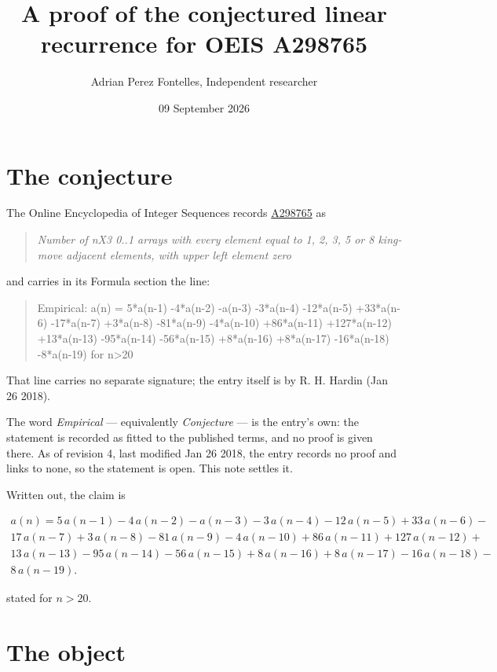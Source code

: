 \documentclass[11pt]{article}
\title{A proof of the conjectured linear recurrence for OEIS A298765}
\author{Adrian Perez Fontelles, Independent researcher}
\date{09 September 2026}
\theoremstyle{definition}
\begin{document}
\maketitle
\section{The conjecture}

The Online Encyclopedia of Integer Sequences records \href{https://oeis.org/A298765}{A298765} as

\begin{quote}\itshape Number of nX3 0..1 arrays with every element equal to 1, 2, 3, 5 or 8 king-move adjacent elements, with upper left element zero\end{quote}

and carries in its Formula section the line:

\begin{quote}\ttfamily Empirical: a(n) = 5*a(n-1) -4*a(n-2) -a(n-3) -3*a(n-4) -12*a(n-5) +33*a(n-6) -17*a(n-7) +3*a(n-8) -81*a(n-9) -4*a(n-10) +86*a(n-11) +127*a(n-12) +13*a(n-13) -95*a(n-14) -56*a(n-15) +8*a(n-16) +8*a(n-17) -16*a(n-18) -8*a(n-19) for n>20\end{quote}

That line carries no separate signature; the entry itself is by R. H. Hardin (Jan 26 2018).

The word {\itshape Empirical} --- equivalently {\itshape Conjecture} --- is the entry's own: the statement is recorded as fitted to the published terms, and no proof is given there. As of revision 4, last modified Jan 26 2018, the entry records no proof and links to none, so the statement is open. This note settles it.

Written out, the claim is

\begin{multline*} a(n) = 5\,a(n-1) - 4\,a(n-2) - a(n-3) - 3\,a(n-4) - 12\,a(n-5) + 33\,a(n-6) - \\ 17\,a(n-7) + 3\,a(n-8) - 81\,a(n-9) - 4\,a(n-10) + 86\,a(n-11) + 127\,a(n-12) + \\ 13\,a(n-13) - 95\,a(n-14) - 56\,a(n-15) + 8\,a(n-16) + 8\,a(n-17) - 16\,a(n-18) - \\ 8\,a(n-19). \end{multline*}

stated for $n > 20$.

\section{The object}
\end{document}
